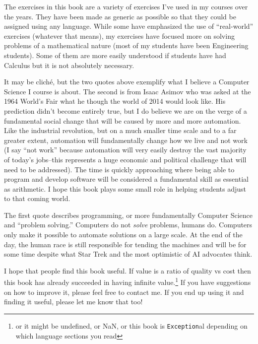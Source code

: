 The exercises in this book are a variety of exercises I've used in my courses over the years.  
They have been made as generic as possible so that they could be assigned using any
language.  While some have emphasized the use of ``real-world'' exercises (whatever that 
means), my exercises have focused more on solving problems of a mathematical nature
(most of my students have been Engineering students).  Some of them are more easily 
understood if students have had Calculus but it is not absolutely necessary.

It may be clich\'{e}, but the two quotes above exemplify what I believe a Computer Science
I course is about.  The second is from Isaac Asimov who was asked at the 1964 
World's Fair what he though the world of 2014 would look like.  His prediction didn't become entirely true, but I do believe we are on the verge of a fundamental social change
that will be caused by more and more automation.  Like the industrial revolution, but
on a much smaller time scale and to a far greater extent, automation will fundamentally
change how we live and not work (I say ``not work'' because automation will very
easily destroy the vast majority of today's jobs--this represents a huge economic and 
political challenge that will need to be addressed).  The time is quickly approaching 
where being able to program and develop software will be considered a fundamental
skill as essential as arithmetic.  I hope this book plays some small role in helping
students adjust to that coming world.

The first quote describes programming, or more fundamentally Computer Science
and ``problem solving.''  Computers do not \emph{solve} problems, humans do.  Computers only make it possible to automate solutions on a large scale.  At the end
of the day, the human race is still responsible for tending the machines and will be
for some time despite what Star Trek and the most optimistic of AI advocates think.

I hope that people find this book useful.  If value is a ratio of quality vs cost then 
this book has already succeeded in having infinite value.\footnote{or it might
be undefined, or NaN, or this book is \texttt{Exception}al depending on which
language sections you read}  If you have suggestions on how to improve it, please
feel free to contact me.  If you end up using it and finding it useful, please let
me know that too!


